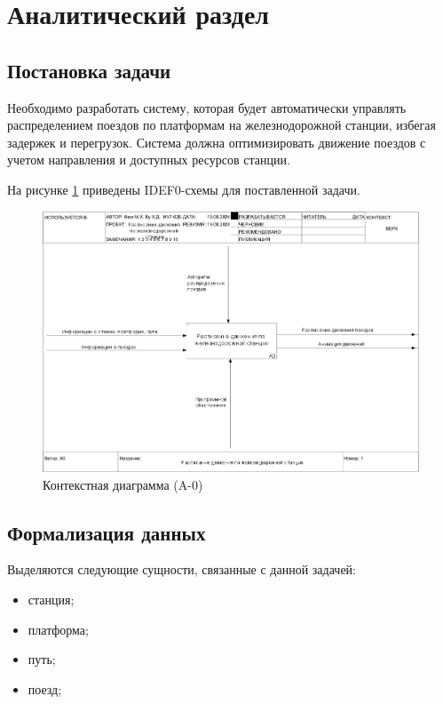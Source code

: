 \section{Аналитический раздел}

\subsection{Постановка задачи}

Необходимо разработать систему, которая будет автоматически управлять распределением поездов по платформам на железнодорожной станции, избегая задержек и перегрузок.
Система должна оптимизировать движение поездов с учетом направления и доступных ресурсов станции.

На рисунке \ref{img:A0} приведены IDEF0-схемы для поставленной задачи.
\begin{figure}[h]
	\centering
	\includegraphics[height=0.45\textheight]{img/idef0/01_A0.png}
	\caption{Контекстная диаграмма (A-0)}
	\label{img:A0}
\end{figure}

\subsection{Формализация данных}

Выделяются следующие сущности, связанные с данной задачей:
\begin{itemize}
	\item станция;
	\item платформа;
	\item путь;
	\item поезд;
\end{itemize}

